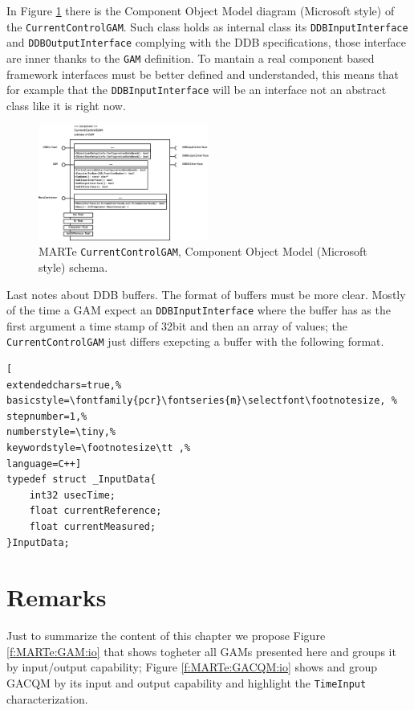 In Figure \ref{f:MARTe:CurrentControlGAM} there is the Component Object Model diagram (Microsoft style) of the \texttt{CurrentControlGAM}. Such class holds as internal class its \texttt{DDBInputInterface} and \texttt{DDBOutputInterface} complying with the DDB specifications, those interface are inner thanks to the \texttt{GAM} definition. To mantain a real component based framework interfaces must be better defined and understanded, this means that for example that the \texttt{DDBInputInterface} will be an interface not an abstract class like it is right now. \\
\begin{figure}[h!]
 \begin{center}
  \includegraphics[width=0.5\textwidth]{MARTe/COM-CurrentControlGAM.eps}
  \caption{MARTe \texttt{CurrentControlGAM}, Component Object Model (Microsoft style) schema.}
  \label{f:MARTe:CurrentControlGAM}
 \end{center}
\end{figure}


Last notes about DDB buffers. The format of buffers must be more clear. Mostly of the time a GAM expect an \texttt{DDBInputInterface} where the buffer has as the first argument a time stamp of 32bit and then an array of values; the \texttt{CurrentControlGAM} just differs exepcting a buffer with the following format.
\begin{lstlisting}[
extendedchars=true,%
basicstyle=\fontfamily{pcr}\fontseries{m}\selectfont\footnotesize, %
stepnumber=1,%
numberstyle=\tiny,%
keywordstyle=\footnotesize\tt ,%
language=C++]
typedef struct _InputData{
    int32 usecTime;
    float currentReference;
    float currentMeasured;
}InputData;
\end{lstlisting}


\section{Remarks}
Just to summarize the content of this chapter we propose Figure \ref{f:MARTe:GAM:io} that shows togheter all GAMs presented here and groups it by input/output capability; Figure \ref{f:MARTe:GACQM:io} shows and group GACQM by its input and output capability and highlight the \texttt{TimeInput} characterization.

